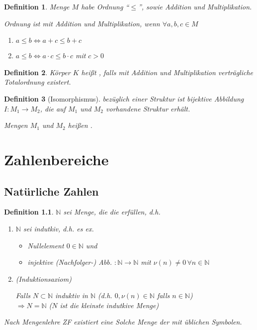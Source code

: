 \documentclass[ngerman,a4paper]{report}
\theoremstyle{break}
\newtheorem*{definition}{Definition}
\newcommand{\person}[1]{\textsc{#1}}
\newcommand{\highlight}[1]{\emph{#1}}
\begin{document}
\begin{definition}
	Menge $M$ habe Ordnung "`$\le$"', sowie Addition und Multiplikation.
	
	Ordnung ist \highlight{mit Addition und Multiplikation}, wenn $\forall a,b,c\in M$
	\begin{enumerate}[label={(\alph*)}]
		\item $a\le b \Leftrightarrow a+c \le b+c$
		\item $a\le b \Leftrightarrow a\cdot c \le b\cdot c$ mit $c > 0$
	\end{enumerate}
\end{definition}

\begin{definition}
	Körper $K$ heißt , falls mit Addition und Multiplikation verträgliche Totalordnung existert.
\end{definition}

\begin{definition}[Isomorphismus]
	 bezüglich einer Struktur ist bijektive Abbildung $I:M_1\rightarrow M_2$, die auf $M_1$ und $M_2$ vorhandene Struktur erhält.
	
	Mengen $M_1$ und $M_2$ heißen .
\end{definition}
\addtocounter{section}{2}

\chapter{Zahlenbereiche}
\section{Natürliche Zahlen}
\begin{definition}
$\mathbb{N}$ sei Menge, die die \begriff{\person{Peano}-Axiome} erfüllen, d.h.
\begin{enumerate}[label={P\arabic*)}]
	\item $\mathbb{N}$ sei indutkiv, d.h. es ex.
	\begin{itemize}
		\item Nullelement $0\in \mathbb{N}$ und
		\item injektive (Nachfolger-) Abb. $:\mathbb{N}\rightarrow\mathbb{N}$ mit $\nu(n)\neq 0\,\forall n\in \mathbb{N}$
	\end{itemize}
	\item (Induktionsaxiom)
	
	Falls $N\subset\mathbb{N}$ induktiv in $\mathbb{N}$ (d.h. $0,\nu(n)\in\mathbb{N}$ falls $n\in\mathbb{N}$)\\
	$\Rightarrow N=\mathbb{N}$ ($N$ ist die kleinste indutkive Menge)
\end{enumerate}

Nach Mengenlehre ZF existiert eine Solche Menge der  mit üblichen Symbolen.
\end{definition}
\end{document}
